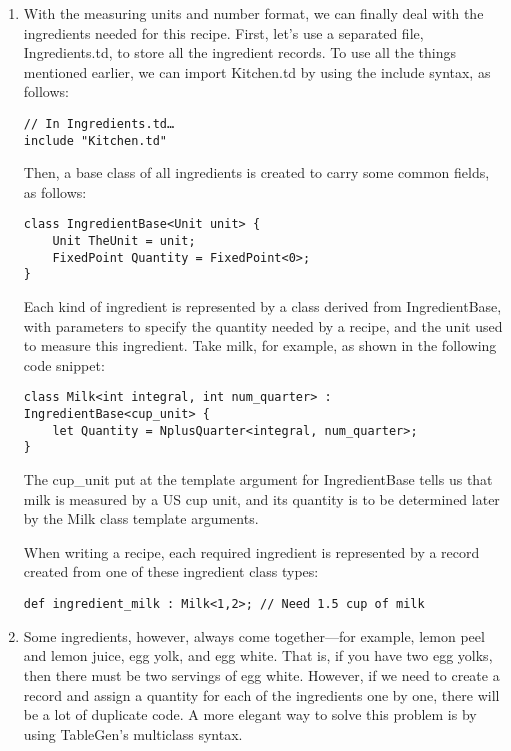 \begin{enumerate}
\item With the measuring units and number format, we can finally deal with the ingredients needed for this recipe. First, let's use a separated file, Ingredients.td, to store all the ingredient records. To use all the things mentioned earlier, we can import Kitchen.td by using the include syntax, as follows:

\begin{lstlisting}[style=styleCXX]
// In Ingredients.td…
include "Kitchen.td"
\end{lstlisting}

Then, a base class of all ingredients is created to carry some common fields, as follows:

\begin{lstlisting}[style=styleCXX]
class IngredientBase<Unit unit> {
	Unit TheUnit = unit;
	FixedPoint Quantity = FixedPoint<0>;
}
\end{lstlisting}

Each kind of ingredient is represented by a class derived from IngredientBase, with parameters to specify the quantity needed by a recipe, and the unit used to measure this ingredient. Take milk, for example, as shown in the following code snippet:

\begin{lstlisting}[style=styleCXX]
class Milk<int integral, int num_quarter> :
IngredientBase<cup_unit> {
	let Quantity = NplusQuarter<integral, num_quarter>;
}
\end{lstlisting}

The cup\_unit put at the template argument for IngredientBase tells us that milk is measured by a US cup unit, and its quantity is to be determined later by the Milk class template arguments.

When writing a recipe, each required ingredient is represented by a record created from one of these ingredient class types:

\begin{lstlisting}[style=styleCXX]
def ingredient_milk : Milk<1,2>; // Need 1.5 cup of milk
\end{lstlisting}

\item Some ingredients, however, always come together—for example, lemon peel and lemon juice, egg yolk, and egg white. That is, if you have two egg yolks, then there must be two servings of egg white. However, if we need to create a record and assign a quantity for each of the ingredients one by one, there will be a lot of duplicate code. A more elegant way to solve this problem is by using TableGen's multiclass syntax.


\end{enumerate}
